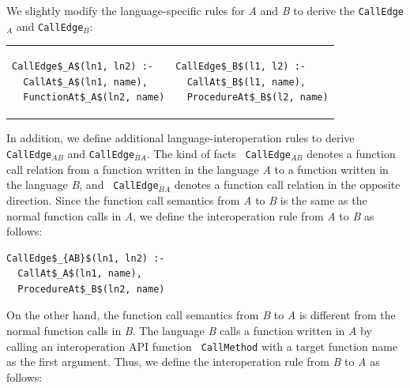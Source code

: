 
\noindent 
We slightly modify the language-specific rules for {\it A} and {\it B} to
derive the {\tt CallEdge$_A$} and {\tt CallEdge$_B$}:

\begin{tabular}{ll}
  {\begin{lstlisting}
CallEdge$_A$(ln1, ln2) :-
  CallAt$_A$(ln1, name),
  FunctionAt$_A$(ln2, name)
  \end{lstlisting}} & 
  {\begin{lstlisting}
CallEdge$_B$(l1, l2) :-
  CallAt$_B$(l1, name),
  ProcedureAt$_B$(l2, name)
  \end{lstlisting}}
\end{tabular}

\noindent
In addition, we define additional language-interoperation rules to derive {\tt
CallEdge$_{AB}$} and {\tt CallEdge$_{BA}$}. The kind of facts {\tt
CallEdge$_{AB}$} denotes a function call relation from a function written in
the language {\it A} to a function written in the language {\it B}, and {\tt
CallEdge$_{BA}$} denotes a function call relation in the opposite direction.
Since the function call semantics from {\it A} to {\it B} is the same as the
normal function calls in {\it A}, we define the interoperation rule from {\it
A} to {\it B} as follows: 


\begin{lstlisting}
CallEdge$_{AB}$(ln1, ln2) :-
  CallAt$_A$(ln1, name),
  ProcedureAt$_B$(ln2, name)
\end{lstlisting}

\noindent
On the other hand, the function call semantics from {\it B} to {\it A} is
different from the normal function calls in {\it B}. The language {\it B} calls
a function written in {\it A} by calling an interoperation API function {\tt
CallMethod} with a target function name as the first argument. Thus, we define
the interoperation rule from {\it B} to {\it A} as follows: 

